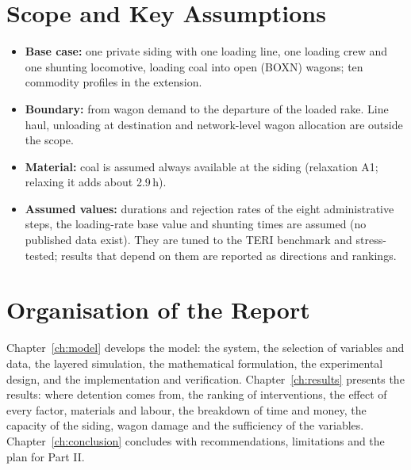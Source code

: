 \section{Scope and Key Assumptions}
\label{sec:scope}
\begin{itemize}
    \item \textbf{Base case:} one private siding with one loading line, one loading crew and one shunting locomotive, loading coal into open (BOXN) wagons; ten commodity profiles in the extension.
    \item \textbf{Boundary:} from wagon demand to the departure of the loaded rake. Line haul, unloading at destination and network-level wagon allocation are outside the scope.
    \item \textbf{Material:} coal is assumed always available at the siding (relaxation A1; relaxing it adds about 2.9\,h).
    \item \textbf{Assumed values:} durations and rejection rates of the eight administrative steps, the loading-rate base value and shunting times are assumed (no published data exist). They are tuned to the TERI benchmark and stress-tested; results that depend on them are reported as directions and rankings.
\end{itemize}

\section{Organisation of the Report}
Chapter~\ref{ch:model} develops the model: the system, the selection of variables and data, the layered simulation, the mathematical formulation, the experimental design, and the implementation and verification. Chapter~\ref{ch:results} presents the results: where detention comes from, the ranking of interventions, the effect of every factor, materials and labour, the breakdown of time and money, the capacity of the siding, wagon damage and the sufficiency of the variables. Chapter~\ref{ch:conclusion} concludes with recommendations, limitations and the plan for Part II.
